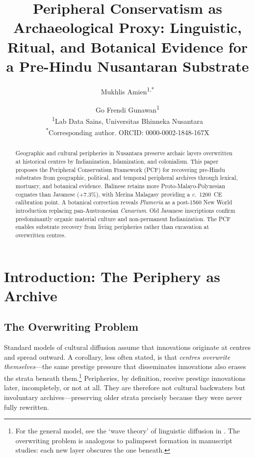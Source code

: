 \documentclass[12pt,a4paper]{article}
\title{\textbf{Peripheral Conservatism as Archaeological Proxy: Linguistic, Ritual, and Botanical Evidence for a Pre-Hindu Nusantaran Substrate}}
\author{Mukhlis Amien\textsuperscript{1,*} \and Go Frendi Gunawan\textsuperscript{1}\\[6pt]
\small \textsuperscript{1}Lab Data Sains, Universitas Bhinneka Nusantara\\
\small \textsuperscript{*}Corresponding author. ORCID: 0000-0002-1848-167X}
\date{}
\begin{document}
\maketitle
\thispagestyle{empty}

\begin{abstract}
\noindent
Geographic and cultural peripheries in Nusantara preserve archaic layers overwritten at historical centres by Indianization, Islamization, and colonialism. This paper proposes the Peripheral Conservatism Framework (PCF) for recovering pre-Hindu substrates from geographic, political, and temporal peripheral archives through lexical, mortuary, and botanical evidence. Balinese retains more Proto-Malayo-Polynesian cognates than Javanese (+7.3\%), with Merina Malagasy providing a \textit{c.}~1200~CE calibration point. A botanical correction reveals \textit{Plumeria} as a post-1560 New World introduction replacing pan-Austronesian \textit{Canarium}. Old Javanese inscriptions confirm predominantly organic material culture and non-permanent Indianization. The PCF enables substrate recovery from living peripheries rather than excavation at overwritten centres.
\end{abstract}

\newpage
\setcounter{page}{1}

\section{Introduction: The Periphery as Archive}

\subsection{The Overwriting Problem}

Standard models of cultural diffusion assume that innovations originate at centres and spread outward. A corollary, less often stated, is that \emph{centres overwrite themselves}---the same prestige pressure that disseminates innovations also erases the strata beneath them.\footnote{For the general model, see the `wave theory' of linguistic diffusion in \autocite{blust1995austronesian}. The overwriting problem is analogous to palimpsest formation in manuscript studies: each new layer obscures the one beneath.} Peripheries, by definition, receive prestige innovations later, incompletely, or not at all. They are therefore not cultural backwaters but involuntary archives---preserving older strata precisely because they were never fully rewritten.
\end{document}

